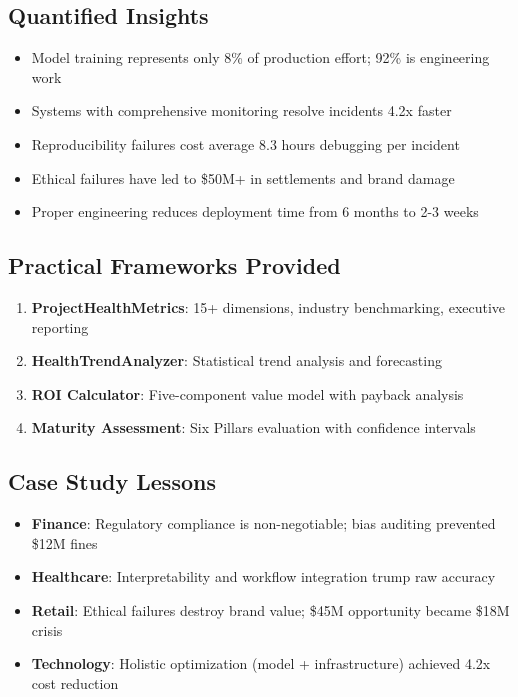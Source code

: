 \subsection{Quantified Insights}

\begin{itemize}
    \item Model training represents only 8\% of production effort; 92\% is engineering work
    \item Systems with comprehensive monitoring resolve incidents 4.2x faster
    \item Reproducibility failures cost average 8.3 hours debugging per incident
    \item Ethical failures have led to \$50M+ in settlements and brand damage
    \item Proper engineering reduces deployment time from 6 months to 2-3 weeks
\end{itemize}

\subsection{Practical Frameworks Provided}

\begin{enumerate}
    \item \textbf{ProjectHealthMetrics}: 15+ dimensions, industry benchmarking, executive reporting
    \item \textbf{HealthTrendAnalyzer}: Statistical trend analysis and forecasting
    \item \textbf{ROI Calculator}: Five-component value model with payback analysis
    \item \textbf{Maturity Assessment}: Six Pillars evaluation with confidence intervals
\end{enumerate}

\subsection{Case Study Lessons}

\begin{itemize}
    \item \textbf{Finance}: Regulatory compliance is non-negotiable; bias auditing prevented \$12M fines
    \item \textbf{Healthcare}: Interpretability and workflow integration trump raw accuracy
    \item \textbf{Retail}: Ethical failures destroy brand value; \$45M opportunity became \$18M crisis
    \item \textbf{Technology}: Holistic optimization (model + infrastructure) achieved 4.2x cost reduction
\end{itemize}

